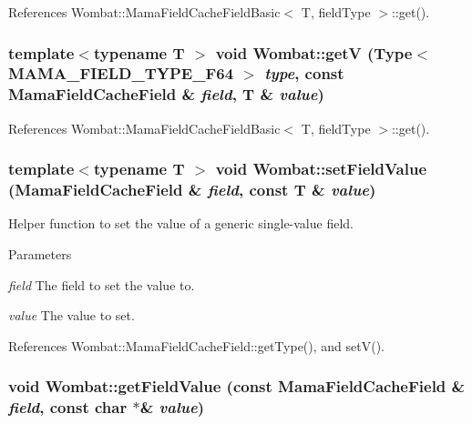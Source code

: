 References Wombat::MamaFieldCacheFieldBasic$<$ T, fieldType $>$::get().\hypertarget{namespaceWombat_a3f1724eba9157b71bb956e9b5223c4d6}{
\subsubsection[{getV}]{\setlength{\rightskip}{0pt plus 5cm}template$<$typename T $>$ void Wombat::getV (Type$<$ MAMA\_\-FIELD\_\-TYPE\_\-F64 $>$ {\em type}, \/  const MamaFieldCacheField \& {\em field}, \/  T \& {\em value})}}
\label{namespaceWombat_a3f1724eba9157b71bb956e9b5223c4d6}


References Wombat::MamaFieldCacheFieldBasic$<$ T, fieldType $>$::get().\hypertarget{namespaceWombat_a94fa64d2a17b47d2a7b8aa81422ca29f}{
\subsubsection[{setFieldValue}]{\setlength{\rightskip}{0pt plus 5cm}template$<$typename T $>$ void Wombat::setFieldValue (MamaFieldCacheField \& {\em field}, \/  const T \& {\em value})}}
\label{namespaceWombat_a94fa64d2a17b47d2a7b8aa81422ca29f}


Helper function to set the value of a generic single-\/value field. 
\begin{DoxyParams}{Parameters}
\item[{\em field}]The field to set the value to. \item[{\em value}]The value to set. \end{DoxyParams}


References Wombat::MamaFieldCacheField::getType(), and setV().\hypertarget{namespaceWombat_a1e9ea0e7b59e8d06e8e2a0ef9f93c45c}{
\subsubsection[{getFieldValue}]{\setlength{\rightskip}{0pt plus 5cm}void Wombat::getFieldValue (const MamaFieldCacheField \& {\em field}, \/  const char $\ast$\& {\em value})}}
\label{namespaceWombat_a1e9ea0e7b59e8d06e8e2a0ef9f93c45c}


